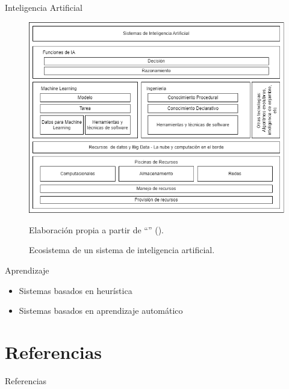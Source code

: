\documentclass[spanish, aspectratio=169]{beamer}
\begin{document}
\begin{frame}[allowframebreaks]{Inteligencia Artificial}

  \begin{figure}[htb]
    \centering
    \includegraphics[height=.6\textheight]{../images/marcoteorico/ai_ecosystem.png}
    \caption{Ecosistema de un sistema de inteligencia artificial.}
      \vspace{-0.2cm}
    \footnotesize{{Elaboración propia a partir de ``\textit{}'' (\citeyear{iso22989}).}}
    \label{fig:ai_ecosystem} 
  \end{figure}

  Aprendizaje \footnotemark
  \begin{itemize}
      \item Sistemas basados en heurística
      \item Sistemas basados en aprendizaje automático
  \end{itemize}


\end{frame}

\section{Referencias}
\begin{frame}[allowframebreaks]{Referencias}
  \printbibliography
\end{frame}
\end{document}
